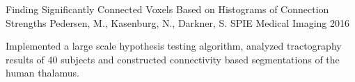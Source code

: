 

\begin{cventries}

  \cventry
    {Finding Significantly Connected Voxels Based on Histograms of Connection Strengths}
    {Pedersen, M., Kasenburg, N., Darkner, S.} %
    {SPIE Medical Imaging \vfill 2016} %
    {} %
    {
      \begin{cvitems} %
        \item {Implemented a large scale hypothesis testing algorithm, analyzed tractography results of 40 subjects and constructed connectivity based segmentations of the human thalamus.}
      \end{cvitems}
    }

\end{cventries}
